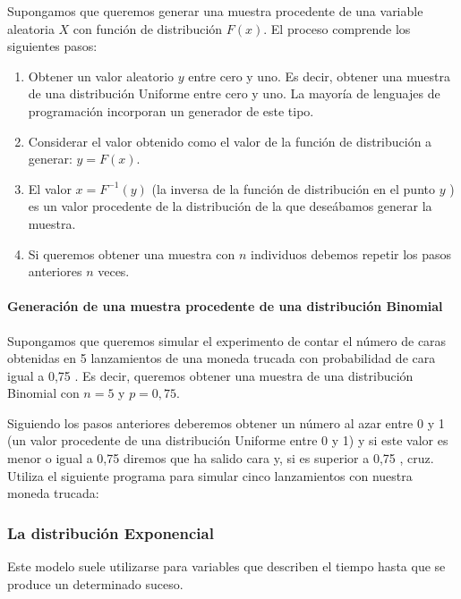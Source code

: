 \documentclass[
]{article}
\begin{document}
Supongamos que queremos generar una muestra procedente de una variable aleatoria \(X\) con función de distribución \(F(x)\). El proceso comprende los siguientes pasos:

\begin{enumerate}
\def\labelenumi{\arabic{enumi}.}
\item
  Obtener un valor aleatorio \(y\) entre cero y uno. Es decir, obtener una muestra de una distribución Uniforme entre cero y uno. La mayoría de lenguajes de programación incorporan un generador de este tipo.
\item
  Considerar el valor obtenido como el valor de la función de distribución a generar: \(y=F(x)\).
\item
  El valor \(x=F^{-1}(y)\) (la inversa de la función de distribución en el punto \(y\) ) es un valor procedente de la distribución de la que deseábamos generar la muestra.
\item
  Si queremos obtener una muestra con \(n\) individuos debemos repetir los pasos anteriores \(n\) veces.
\end{enumerate}

\paragraph{Generación de una muestra procedente de una distribución Binomial}\label{generaciuxf3n-de-una-muestra-procedente-de-una-distribuciuxf3n-binomial}

Supongamos que queremos simular el experimento de contar el número de caras obtenidas en 5 lanzamientos de una moneda trucada con probabilidad de cara igual a 0,75 . Es decir, queremos obtener una muestra de una distribución Binomial con \(n=5\) y \(p=0,75\).

Siguiendo los pasos anteriores deberemos obtener un número al azar entre 0 y 1 (un valor procedente de una distribución Uniforme entre 0 y 1) y si este valor es menor o igual a 0,75 diremos que ha salido cara y, si es superior a 0,75 , cruz. Utiliza el siguiente programa para simular cinco lanzamientos con nuestra moneda trucada:

\subsubsection{La distribución Exponencial}\label{la-distribuciuxf3n-exponencial}

Este modelo suele utilizarse para variables que describen el tiempo hasta que se produce un determinado suceso.
\end{document}
